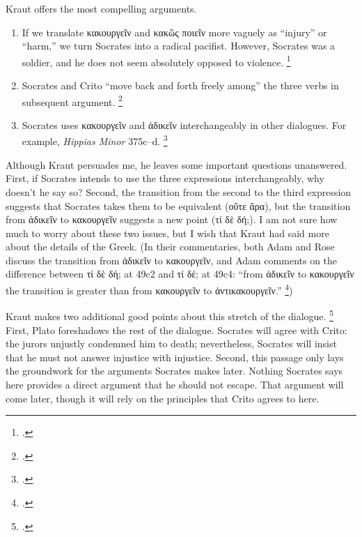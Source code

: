 \documentclass[12pt,letterpaper]{article}
\begin{document}
Kraut offers the most compelling arguments.

\begin{enumerate}
    \item If we translate \textgreek{κακουργεῖν} and \textgreek{κακῶς ποιεῖν} more vaguely as ``injury'' or ``harm,'' we turn Socrates into a radical pacifist.
        However, Socrates was a soldier, and he does not seem absolutely opposed to violence.%
        \footcite[][26, note 2]{kraut-socrates-state-1984}
    \item Socrates and Crito ``move back and forth freely among'' the three verbs in subsequent argument.%
        \footcite[][29]{kraut-socrates-state-1984}
    \item Socrates uses \textgreek{κακουργεῖν} and \textgreek{ἀδικεῖν} interchangeably in other dialogues.
        For example, \textit{Hippias Minor} 375c--d.%
        \footcite[][28, note 6]{kraut-socrates-state-1984}
\end{enumerate}

Although Kraut persuades me, he leaves some important questions unanswered.
First, if Socrates intends to use the three expressions interchangeably, why doesn't he say so?
Second, the transition from the second to the third expression suggests that Socrates takes them to be equivalent (\textgreek{οὔτε ἄρα}), but the transition from \textgreek{ἀδικεῖν} to \textgreek{κακουργεῖν} suggests a new point (\textgreek{τί δὲ δή;}).
I am not sure how much to worry about these two issues, but I wish that Kraut had said more about the details of the Greek.
(In their commentaries, both Adam and Rose discuss the transition from \textgreek{ἀδικεῖν} to \textgreek{κακουργεῖν}, and Adam comments on the difference between \textgreek{τί δὲ δή;} at 49c2 and \textgreek{τί δέ;} at 49c4: ``from \textgreek{ἀδικεῖν} to \textgreek{κακουργεῖν} the transition is greater than from \textgreek{κακουργεῖν} to \textgreek{ἀντικακουργεῖν}.''%
\footcites[][on 49c2]{adam1988-crito}[][on 49c2]{rose-crito-1983})

Kraut makes two additional good points about this stretch of the dialogue.%
\footcite[][28--29]{kraut-socrates-state-1984} First, Plato foreshadows the rest of the dialogue.
Socrates will agree with Crito: the jurors unjustly condemned him to death; nevertheless, Socrates will insist that he must not answer injustice with injustice.
Second, this passage only lays the groundwork for the arguments Socrates makes later.
Nothing Socrates says here provides a direct argument that he should not escape.
That argument will come later, though it will rely on the principles that Crito agrees to here.
\end{document}
